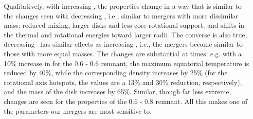 Qualitatively, with increasing \azero, the properties change in a way that is similar to the changes seen with decreasing \qrho, i.e., similar to mergers with more dissimilar mass: reduced mixing, larger disks and less core rotational support, and shifts in the thermal and rotational energies toward larger radii.  The converse is also true, decreasing \azero\ has similar effects as increasing \qrho, i.e., the mergers become similar to those with more equal masses.  The changes are substantial at times: e.g. with a 10\% increase in {\azero} for the 0.6 - 0.6 {\Msun} remnant, the maximum equatorial temperature is reduced by 40\%, while the corresponding density increases by 25\% (for the rotational axis hotspots, the values are a 13\% and 30\% reduction, respectively), and the mass of the disk increases by 65\%.  Similar, though far less extreme, changes are seen for the properties of the 0.6 - 0.8 {\Msun} remnant.  All this makes {\azero} one of the parameters our mergers are most sensitive to.




